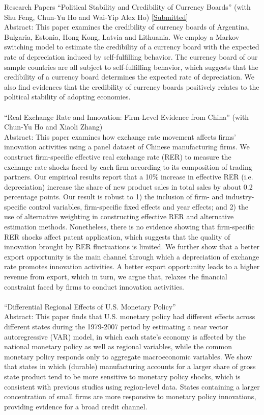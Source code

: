 \documentclass{resume} %
\begin{document}
\begin{rSection}{Research Papers}
``Political Stability and Credibility of Currency Boards'' (with Shu Feng, Chun-Yu Ho and Wai-Yip Alex Ho) [\underline{Submitted}] \\
Abstract: This paper examines the credibility of currency boards of Argentina, Bulgaria, Estonia, Hong Kong, Latvia and Lithuania. We employ a Markov switching model to estimate the credibility of a currency board with the expected rate of depreciation induced by self-fulfilling behavior. The currency board of our sample countries are all subject to self-fulfilling behavior, which suggests that the credibility of a currency board determines the expected rate of depreciation. We also find evidences that the credibility of currency boards positively relates to the political stability of adopting economies.
\\
\\
``Real Exchange Rate and Innovation: Firm-Level Evidence from China'' (with Chun-Yu Ho and Xiaoli Zhang) \\
Abstract: This paper examines how exchange rate movement affects firms' innovation activities using a panel dataset of Chinese manufacturing firms. We construct firm-specific effective real exchange rate (RER) to measure the exchange rate shocks faced by each firm according to its composition of trading partners.  Our empirical results report that a 10\% increase in effective RER (i.e. depreciation) increase the share of new product sales in total sales by about 0.2 percentage points. Our result is robust to 1) the inclusion of firm- and industry-specific control variables, firm-specific fixed effects and year effects; and 2) the use of alternative weighting in constructing effective RER and alternative estimation methods. Nonetheless, there is no evidence showing that firm-specific RER shocks affect patent application, which suggests that the quality of innovation brought by RER fluctuations is limited. We further show that a better export opportunity is the main channel through which a depreciation of exchange rate promotes innovation activities. A better export opportunity leads to a higher revenue from export, which in turn, we argue that, relaxes the financial constraint faced by firms to conduct innovation activities.
\\
\\
``Differential Regional Effects of U.S. Monetary Policy'' \\
Abstract: This paper finds that U.S. monetary policy had different effects across different states during the 1979-2007 period by estimating a near vector autoregressive (VAR) model, in which each state's economy is affected by the national monetary policy as well as regional variables, while the common monetary policy responds only to aggregate macroeconomic variables. We show that states in which (durable) manufacturing accounts for a larger share of gross state product tend to be more sensitive to monetary policy shocks, which is consistent with previous studies using region-level data. States containing a larger concentration of small firms are more responsive to
monetary policy innovations, providing evidence for a broad credit channel.
\\


\end{rSection}
\end{document}
